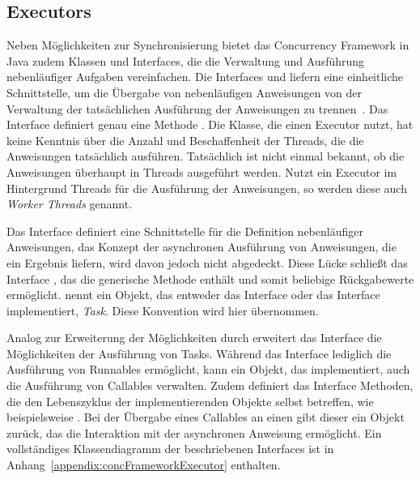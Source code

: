 \subsection{Executors}\label{sec:executor} Neben Möglichkeiten zur Synchronisierung bietet das Concurrency Framework in Java zudem Klassen und Interfaces, die die Verwaltung und Ausführung nebenläufiger Aufgaben vereinfachen. Die Interfaces  und  liefern eine einheitliche Schnittstelle, um die Übergabe von nebenläufigen Anweisungen von der Verwaltung der tatsächlichen Ausführung der Anweisungen zu trennen~\cite[S.~70~ff.]{Friesen2015}. Das Interface  definiert genau eine Methode . Die Klasse, die einen Executor nutzt, hat keine Kenntnis über die Anzahl und Beschaffenheit der Threads, die die Anweisungen tatsächlich ausführen. Tatsächlich ist nicht einmal bekannt, ob die Anweisungen überhaupt in Threads ausgeführt werden. Nutzt ein Executor im Hintergrund Threads für die Ausführung der Anweisungen, so werden diese auch \emph{Worker Threads} genannt.

Das Interface  definiert eine Schnittstelle für die Definition nebenläufiger Anweisungen, das Konzept der asynchronen Ausführung von Anweisungen, die ein Ergebnis liefern, wird davon jedoch nicht abgedeckt. Diese Lücke schließt das Interface , das die generische Methode  enthält und somit beliebige Rückgabewerte ermöglicht. \textcite{Friesen2015} nennt ein Objekt, das entweder das Interface  oder das Interface  implementiert, \emph{Task}. Diese Konvention wird hier übernommen. 

Analog zur Erweiterung der Möglichkeiten durch  erweitert das Interface  die Möglichkeiten der Ausführung von Tasks. Während das Interface  lediglich die Ausführung von Runnables ermöglicht, kann ein Objekt, das  implementiert, auch die Ausführung von Callables verwalten. Zudem definiert das Interface Methoden, die den Lebenszyklus der implementierenden Objekte selbst betreffen, wie beispielsweise . Bei der Übergabe eines Callables an einen  gibt dieser ein Objekt  zurück, das die Interaktion mit der asynchronen Anweisung ermöglicht. Ein vollständiges Klassendiagramm der beschriebenen Interfaces ist in Anhang~\ref{appendix:concFrameworkExecutor} enthalten.

